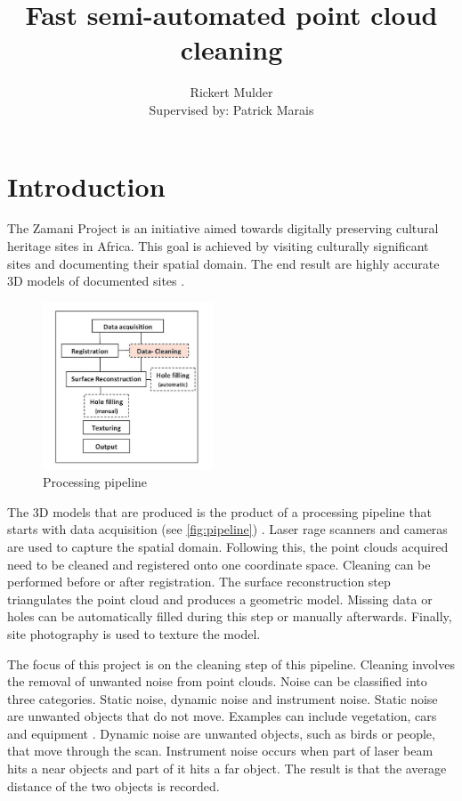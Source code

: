 \documentclass[10pt,twocolumn]{article}
\title{Fast semi-automated point cloud cleaning}
\author{Rickert Mulder\\ Supervised by: Patrick Marais}
\date{}
\begin{document}
\maketitle

\section{Introduction}
The Zamani Project is an initiative aimed towards digitally preserving cultural heritage sites in Africa. This goal is achieved by visiting culturally significant sites and documenting their spatial domain. The end result are highly accurate 3D models of documented sites \cite{Ruther2011}.

\begin{figure}[htb]
\centering
\includegraphics[width=0.45\textwidth]{pics/pipeline.png}
\caption{Processing pipeline \cite{Ruther2011}}
\label{fig:pipeline}
\end{figure}


The 3D models that are produced is the product of a processing pipeline that starts with data acquisition (see \autoref{fig:pipeline}) \cite{Ruther2011}. Laser rage scanners and cameras are used to capture the spatial domain. Following this, the point clouds acquired need to be cleaned and registered onto one coordinate space. Cleaning can be performed before or after registration. The surface reconstruction step triangulates the point cloud and produces a geometric model. Missing data or holes can be automatically filled during this step or manually afterwards. Finally, site photography is used to texture the model.

The focus of this project is on the cleaning step of this pipeline. Cleaning involves the removal of unwanted noise from point clouds. Noise can be classified into three categories. Static noise, dynamic noise and instrument noise. Static noise are unwanted objects that do not move. Examples can include vegetation, cars and equipment \cite{Held2012}. Dynamic noise are unwanted objects, such as birds or people, that move through the scan. Instrument noise occurs when part of laser beam hits a near objects and part of it hits a far object. The result is that the average distance of the two objects is recorded.
\end{document}
